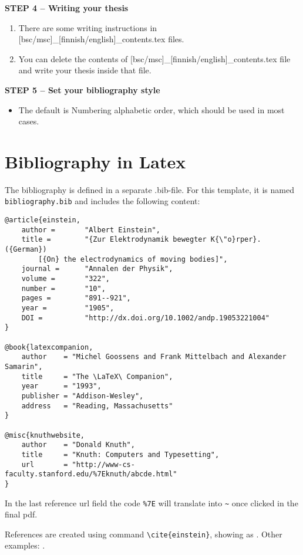 {\textbf{STEP 4 -- Writing your thesis}}

\begin{enumerate}
\item There are some writing instructions in [bsc/msc]\_[finnish/english]\_contents.tex files.
\item You can delete the contents of [bsc/msc]\_[finnish/english]\_contents.tex file and write your thesis inside that file.
\end{enumerate}

{\textbf{STEP 5 -- Set your bibliography style}}

\begin{itemize}
\item The default is Numbering alphabetic order, which should be used in most cases.
\end{itemize}

\section{Bibliography in Latex}

The bibliography is defined in a separate .bib-file. For this template, it is named \texttt{bibliography.bib} and includes the following content:
\begin{verbatim}
@article{einstein,
    author =       "Albert Einstein",
    title =        "{Zur Elektrodynamik bewegter K{\"o}rper}. ({German})
        [{On} the electrodynamics of moving bodies]",
    journal =      "Annalen der Physik",
    volume =       "322",
    number =       "10",
    pages =        "891--921",
    year =         "1905",
    DOI =          "http://dx.doi.org/10.1002/andp.19053221004"
}
 
@book{latexcompanion,
    author    = "Michel Goossens and Frank Mittelbach and Alexander Samarin",
    title     = "The \LaTeX\ Companion",
    year      = "1993",
    publisher = "Addison-Wesley",
    address   = "Reading, Massachusetts"
}
 
@misc{knuthwebsite,
    author    = "Donald Knuth",
    title     = "Knuth: Computers and Typesetting",
    url       = "http://www-cs-faculty.stanford.edu/%7Eknuth/abcde.html"
}
\end{verbatim}

In the last reference url field the code \verb+%7E+ will translate into \verb+~+ once clicked in the final pdf.

References are created using command \texttt{\textbackslash cite\{einstein\}}, showing as \citep{einstein}. Other examples: \citep{latexcompanion,knuthwebsite}.

